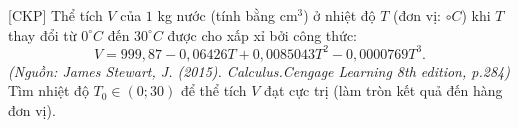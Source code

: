 \begin{bt}%
[CKP]%
	Thể tích $V$ của $1$ kg nước (tính bằng $\text{cm}^3$) ở nhiệt độ $T$ (đơn vị: $\circ C$) khi $T$ thay đổi từ $0^\circ C$ đến $30^\circ C$ được cho xấp xỉ bởi công thức:
	$$V=999{,}87-0{,}06426T+0{,}0085043T^2-0{,}0000769T^3.$$
	\textit{(Nguồn: James Stewart, J. (2015). Calculus.Cengage Learning 8th edition, p.284)}\\ Tìm nhiệt độ $T_0 \in \left(0;30\right)$ để thể tích $V$ đạt cực trị (làm tròn kết quả đến hàng đơn vị).
\end{bt}

